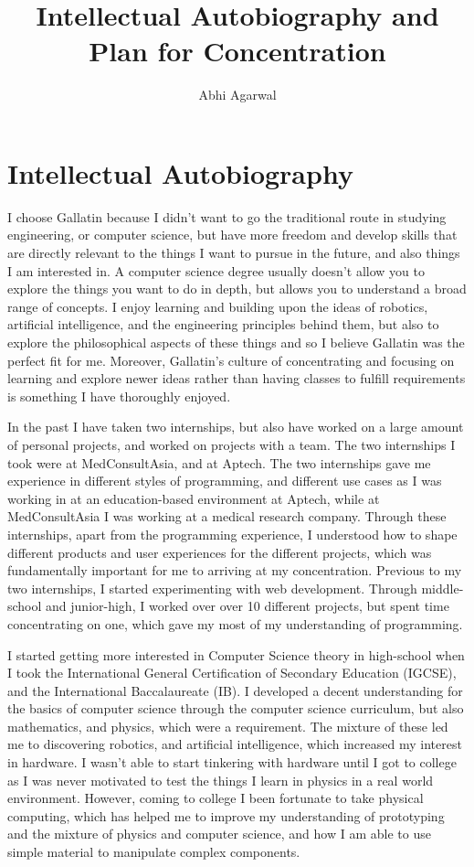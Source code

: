 \documentclass[11pt, oneside]{article}   	%
\title{Intellectual Autobiography and Plan for Concentration}
\author{Abhi Agarwal}
\date{} %
\begin{document}
\maketitle
\section{Intellectual Autobiography}

\par I choose Gallatin because I didn't want to go the traditional route in studying engineering, or computer science, but have more freedom and develop skills that are directly relevant to the things I want to pursue in the future, and also things I am interested in. A computer science degree usually doesn't allow you to explore the things you want to do in depth, but allows you to understand a broad range of concepts. I enjoy learning and building upon the ideas of robotics, artificial intelligence, and the engineering principles behind them, but also to explore the philosophical aspects of these things and so I believe Gallatin was the perfect fit for me. Moreover, Gallatin's culture of concentrating and focusing on learning and explore newer ideas rather than having classes to fulfill requirements is something I have thoroughly enjoyed.

\par In the past I have taken two internships, but also have worked on a large amount of personal projects, and worked on projects with a team. The two internships I took were at MedConsultAsia, and at Aptech. The two internships gave me experience in different styles of programming, and different use cases as I was working in at an education-based environment at Aptech, while at MedConsultAsia I was working at a medical research company. Through these internships, apart from the programming experience, I understood how to shape different products and user experiences for the different projects, which was fundamentally important for me to arriving at my concentration. Previous to my two internships, I started experimenting with web development. Through middle-school and junior-high, I worked over over 10 different projects, but spent time concentrating on one, which gave my most of my understanding of programming.

\par I started getting more interested in Computer Science theory in high-school when I took the International General Certification of Secondary Education (IGCSE), and the International Baccalaureate (IB). I developed a decent understanding for the basics of computer science through the computer science curriculum, but also mathematics, and physics, which were a requirement. The mixture of these led me to discovering robotics, and artificial intelligence, which increased my interest in hardware. I wasn't able to start tinkering with hardware until I got to college as I was never motivated to test the things I learn in physics in a real world environment. However, coming to college I been fortunate to take physical computing, which has helped me to improve my understanding of prototyping and the mixture of physics and computer science, and how I am able to use simple material to manipulate complex components.
\end{document}
